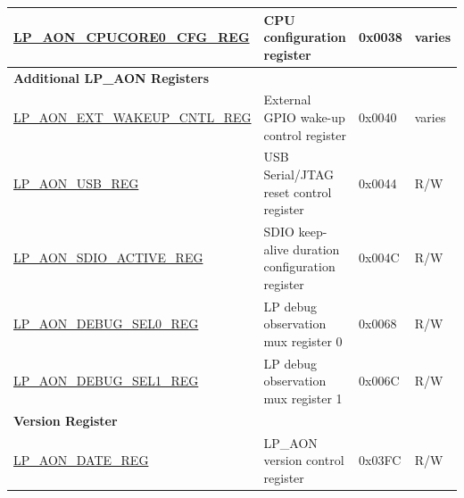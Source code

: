 \begin{longtable}{ | p{6cm} | p{7.2cm} | p{1.3cm} | p{1cm} | }
\hyperref[regdesc:LPAONCPUCORE0CFGREG]{LP\_AON\_CPUCORE0\_CFG\_REG} & CPU configuration register & 0x0038 & varies \\ \hline
\multicolumn{4}{|l|}{\textbf{Additional LP\_AON Registers}} \\ \hline
\hyperref[regdesc:LPAONEXTWAKEUPCNTLREG]{LP\_AON\_EXT\_WAKEUP\_CNTL\_REG} & External GPIO wake-up control register & 0x0040 & varies \\ \hline
\hyperref[regdesc:LPAONUSBREG]{LP\_AON\_USB\_REG} & USB Serial/JTAG reset control register & 0x0044 & R/W \\ \hline
\hyperref[regdesc:LPAONSDIOACTIVEREG]{LP\_AON\_SDIO\_ACTIVE\_REG} & SDIO keep-alive duration configuration register & 0x004C & R/W \\ \hline
\hyperref[regdesc:LPAONDEBUGSEL0REG]{LP\_AON\_DEBUG\_SEL0\_REG} & LP debug observation mux register 0 & 0x0068 & R/W \\ \hline
\hyperref[regdesc:LPAONDEBUGSEL1REG]{LP\_AON\_DEBUG\_SEL1\_REG} & LP debug observation mux register 1 & 0x006C & R/W \\ \hline
\multicolumn{4}{|l|}{\textbf{Version Register}} \\ \hline
\hyperref[regdesc:LPAONDATEREG]{LP\_AON\_DATE\_REG} & LP\_AON version control register & 0x03FC & R/W \\ \hline
\end{longtable}
